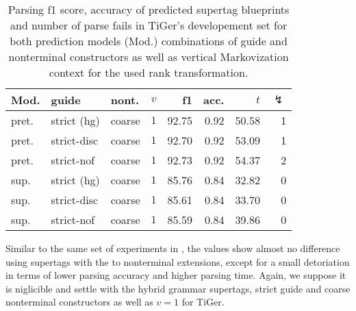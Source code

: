 \documentclass[../../document.tex]{subfiles}
\begin{document}
    \begin{table}
        \caption{\label{tbl:experiments:dptb:dcp}
        Parsing f1 score, accuracy of predicted  supertag blueprints and number of parse fails in TiGer's developement set for both prediction models (Mod.) combinations of guide and nonterminal constructors as well as vertical Markovization context for the used rank transformation.
        }
        \centering
        \setlength{\tabcolsep}{4pt}
        \vspace{.2cm}
        \begin{tabular}{lllc|rrrr}
            \toprule
Mod. &  guide &   nont.   &\(v\)   & f1 & acc. & $t$ & $\lightning$ \\ \hline \rowcolor{black!10}
pret. & strict (hg) &  coarse & \(1\)  & 92.75 & 0.92 & 50.58 & 1  \\\hline
pret. & strict-disc    &  coarse & \(1\)  & 92.70 & 0.92 & 53.09 & 1  \\
pret. & strict-nof     &  coarse & \(1\)  & 92.73 & 0.92 & 54.37 & 2  \\
\midrule \rowcolor{black!10}
sup. & strict (hg) &  coarse & \(1\)  & 85.76 & 0.84 & 32.82 & 0  \\\hline
sup. & strict-disc    &  coarse & \(1\)  & 85.61 & 0.84 & 33.70 & 0  \\
sup. & strict-nof     &  coarse & \(1\)  & 85.59 & 0.84 & 39.86 & 0  \\
    \bottomrule
        \end{tabular}
    \end{table}

    Similar to the same set of experiments in , the values show almost no difference using  supertags with the to nonterminal extensions, except for a small detoriation in terms of lower parsing accuracy and higher parsing time.
    Again, we suppose it is niglicible and settle with the hybrid grammar supertags, strict guide and coarse nonterminal constructors as well as $v=1$ for TiGer.
\end{document}

